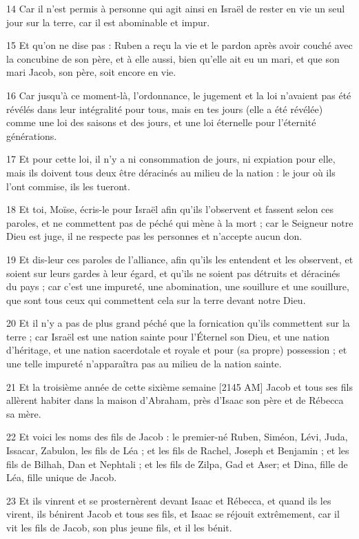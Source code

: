 \par 14 Car il n'est permis à personne qui agit ainsi en Israël de rester en vie un seul jour sur la terre, car il est abominable et impur.
\par 15 Et qu'on ne dise pas : Ruben a reçu la vie et le pardon après avoir couché avec la concubine de son père, et à elle aussi, bien qu'elle ait eu un mari, et que son mari Jacob, son père, soit encore en vie.
\par 16 Car jusqu'à ce moment-là, l'ordonnance, le jugement et la loi n'avaient pas été révélés dans leur intégralité pour tous, mais en tes jours (elle a été révélée) comme une loi des saisons et des jours, et une loi éternelle pour l'éternité générations.
\par 17 Et pour cette loi, il n'y a ni consommation de jours, ni expiation pour elle, mais ils doivent tous deux être déracinés au milieu de la nation : le jour où ils l'ont commise, ils les tueront.
\par 18 Et toi, Moïse, écris-le pour Israël afin qu'ils l'observent et fassent selon ces paroles, et ne commettent pas de péché qui mène à la mort ; car le Seigneur notre Dieu est juge, il ne respecte pas les personnes et n'accepte aucun don.
\par 19 Et dis-leur ces paroles de l'alliance, afin qu'ils les entendent et les observent, et soient sur leurs gardes à leur égard, et qu'ils ne soient pas détruits et déracinés du pays ; car c'est une impureté, une abomination, une souillure et une souillure, que sont tous ceux qui commettent cela sur la terre devant notre Dieu.
\par 20 Et il n'y a pas de plus grand péché que la fornication qu'ils commettent sur la terre ; car Israël est une nation sainte pour l'Éternel son Dieu, et une nation d'héritage, et une nation sacerdotale et royale et pour (sa propre) possession ; et une telle impureté n'apparaîtra pas au milieu de la nation sainte.
\par 21 Et la troisième année de cette sixième semaine [2145 AM] Jacob et tous ses fils allèrent habiter dans la maison d'Abraham, près d'Isaac son père et de Rébecca sa mère.
\par 22 Et voici les noms des fils de Jacob : le premier-né Ruben, Siméon, Lévi, Juda, Issacar, Zabulon, les fils de Léa ; et les fils de Rachel, Joseph et Benjamin ; et les fils de Bilhah, Dan et Nephtali ; et les fils de Zilpa, Gad et Aser; et Dina, fille de Léa, fille unique de Jacob.
\par 23 Et ils vinrent et se prosternèrent devant Isaac et Rébecca, et quand ils les virent, ils bénirent Jacob et tous ses fils, et Isaac se réjouit extrêmement, car il vit les fils de Jacob, son plus jeune fils, et il les bénit.

